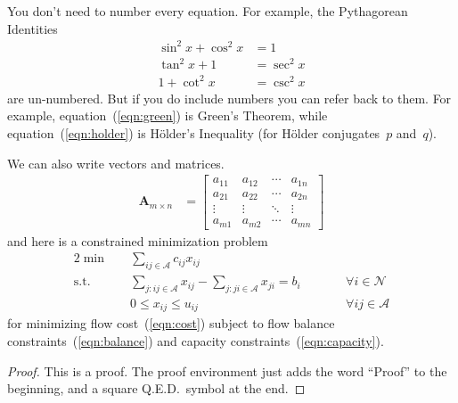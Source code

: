 \documentclass[11pt]{article}
\begin{document}
You don't need to number every equation. For example, the Pythagorean Identities
\begin{align*} %
	\sin^2 x + \cos^2 x &= 1 \\
	\tan^2 x + 1 &= \sec^2 x \\
	1 + \cot^2 x &= \csc^2 x
\end{align*} %
are un-numbered. But if you do include numbers you can refer back to them. For example, equation~(\ref{eqn:green}) is Green's Theorem, while equation~(\ref{eqn:holder}) is H\"older's Inequality (for H\"older conjugates~$p$ and~$q$). %

We can also write vectors and matrices.
\begin{align*}
	\mathbf{A}_{m \times n} &=
	\begin{bmatrix}
		a_{11} & a_{12} & \cdots & a_{1n} \\
		a_{21} & a_{22} & \cdots & a_{2n} \\
		\vdots & \vdots & \ddots & \vdots \\
		a_{m1} & a_{m2} & \cdots & a_{mn}
	\end{bmatrix}
\end{align*}
and here is a constrained minimization problem
\begin{alignat}{2} %
	\label{eqn:cost} \min \quad& \sum_{ij \in \mathcal{A}} c_{ij} x_{ij} \\
	\label{eqn:balance} \mathrm{s.t.} \quad& \sum_{j : ij \in \mathcal{A}} x_{ij} - \sum_{j : ji \in \mathcal{A}} x_{ji} = b_i &\qquad& \forall i \in \mathcal{N} \\ %
	\label{eqn:capacity} & 0 \le x_{ij} \le u_{ij} && \forall ij \in \mathcal{A}
\end{alignat}
for minimizing flow cost~(\ref{eqn:cost}) subject to flow balance constraints~(\ref{eqn:balance}) and capacity constraints~(\ref{eqn:capacity}).

\begin{proof}
This is a proof. The proof environment just adds the word ``Proof'' to the beginning, and a square Q.E.D.\ symbol at the end. %
\end{proof}
\end{document}
